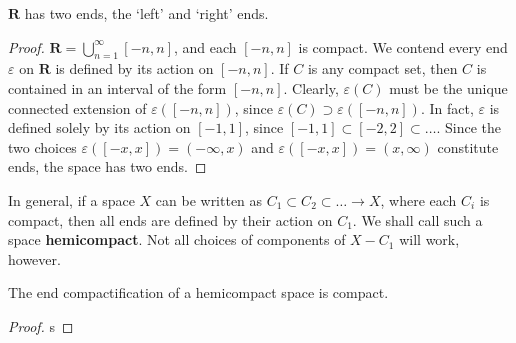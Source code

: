 \begin{lemma}
    $\mathbf{R}$ has two ends, the `left' and `right' ends.
\end{lemma}
\begin{proof}
    $\mathbf{R} = \bigcup_{n = 1}^\infty [-n, n]$, and each $[-n, n]$ is compact. We contend every end $\varepsilon$ on $\mathbf{R}$ is defined by its action on $[-n, n]$. If $C$ is any compact set, then $C$ is contained in an interval of the form $[-n, n]$. Clearly, $\varepsilon(C)$ must be the unique connected extension of $\varepsilon([-n, n])$, since $\varepsilon(C) \supset \varepsilon([-n,n])$. In fact, $\varepsilon$ is defined solely by its action on $[-1,1]$, since $[-1,1] \subset [-2,2] \subset \dots$. Since the two choices $\varepsilon([-x,x]) = (-\infty, x)$ and $\varepsilon([-x,x]) = (x,\infty)$ constitute ends, the space has two ends.
\end{proof}

In general, if a space $X$ can be written as $C_1 \subset C_2 \subset \dots \to X$, where each $C_i$ is compact, then all ends are defined by their action on $C_1$. We shall call such a space {\bf hemicompact}. Not all choices of components of $X - C_1$ will work, however.

\begin{lemma}
    The end compactification of a hemicompact space is compact.
\end{lemma}
\begin{proof}
    s
\end{proof}

